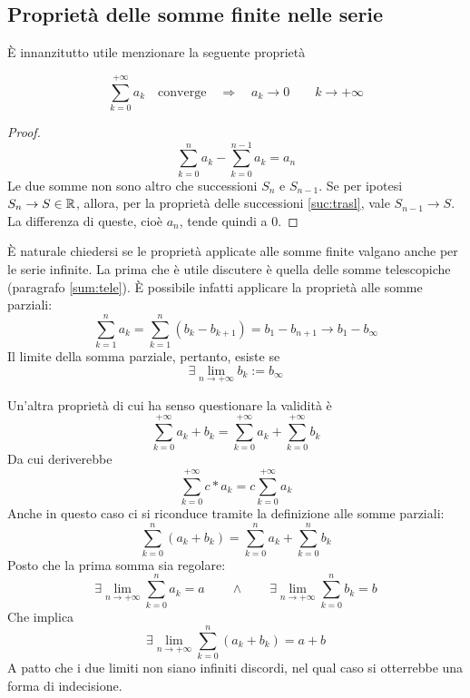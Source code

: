 \subsection{Proprietà delle somme finite nelle serie}
È innanzitutto utile menzionare la seguente proprietà
\begin{teor}
	\label{teor:necconv}
	\[
		\sum_{k=0}^{+\infty} a_k\quad\text{converge}\quad\Rightarrow\quad a_k\to0\qquad k\to+\infty
	\]
\end{teor}
\begin{proof}
	\[
		\sum_{k=0}^n a_k-\sum_{k=0}^{n-1} a_k=a_n
	\]
	Le due somme non sono altro che successioni $S_n$ e $S_{n-1}$. Se per ipotesi $S_n\to S\in\mathbb{R}$, allora, per la proprietà delle successioni \vref{suc:trasl}, vale $S_{n-1}\to S$. La differenza di queste, cioè $a_n$, tende quindi a $0$.
\end{proof}

È naturale chiedersi se le proprietà applicate alle somme finite valgano anche per le serie infinite. La prima che è utile discutere è quella delle somme telescopiche (paragrafo \ref{sum:tele}). È possibile infatti applicare la proprietà alle somme parziali:
\[
	\sum_{k=1}^n a_k=\sum_{k=1}^n(b_k-b_{k+1})=b_1-b_{n+1}\to b_1-b_\infty
\]
Il limite della somma parziale, pertanto, esiste se
\[
	\exists \lim_{n\to+\infty} b_k := b_\infty
\]

Un'altra proprietà di cui ha senso questionare la validità è
\[
	\sum_{k=0}^{+\infty} a_k+b_k=\sum_{k=0}^{+\infty} a_k+\sum_{k=0}^{+\infty} b_k
\]
Da cui deriverebbe
\[
	\sum_{k=0}^{+\infty} c*a_k=c\sum_{k=0}^{+\infty} a_k
\]
Anche in questo caso ci si riconduce tramite la definizione alle somme parziali:
\[
	\sum_{k=0}^n (a_k+b_k)=\sum_{k=0}^n a_k + \sum_{k=0}^n b_k
\]
Posto che la prima somma sia regolare:
\[
	\exists \lim_{n\to+\infty} \sum_{k=0}^n a_k=a\qquad\land\qquad\exists \lim_{n\to+\infty} \sum_{k=0}^n b_k=b
\]
Che implica
\[
	\exists \lim_{n\to+\infty} \sum_{k=0}^n (a_k+b_k)=a+b
\]
A patto che i due limiti non siano infiniti discordi, nel qual caso si otterrebbe una forma di indecisione.


